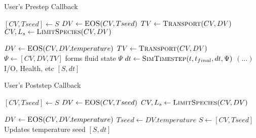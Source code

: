 \documentclass{article}
\begin{document}
%
%
\begin{algorithm}
  \caption{User's Prestep Callback}
  \begin{algorithmic}[1]
    \State $[CV, Tseed] \gets S$
    \State $DV \gets \Call{EOS}{CV, Tseed}$
    \State $TV \gets \Call{Transport}{CV, DV}$
    \State $CV, L_s \gets \Call{LimitSpecies}{CV, DV}$
 
    \State $DV \gets \Call{EOS}{CV, DV.temperature}$
    \State $TV \gets \Call{Transport}{CV, DV}$    
    \State $\Psi \gets [CV, DV, TV]$ \Comment forms fluid state $\Psi$
    \State $dt \gets \Call{SimTimestep}{t, t_{final}, dt, \Psi}$
    \Statex $ ( ... )$ \Comment I/O, Health, etc
    \State \Return $[S, dt]$
    \EndProcedure  \end{algorithmic}
\end{algorithm}

\begin{algorithm}
  \caption{User's Poststep Callback}
  \begin{algorithmic}[1]
    \State $[CV, Tseed] \gets S$
    \State $DV \gets \Call{EOS}{CV, Tseed}$
    \State $CV, L_s \gets \Call{LimitSpecies}{CV, DV}$

    \State $DV \gets \Call{EOS}{CV, DV.temperature}$
    \State $Tseed \gets DV.temperature$
    \State $S \gets [CV, Tseed]$ \Comment Updates temperature seed
    \State \Return $[S, dt]$
    \EndProcedure  \end{algorithmic}
\end{algorithm}
\end{document}
